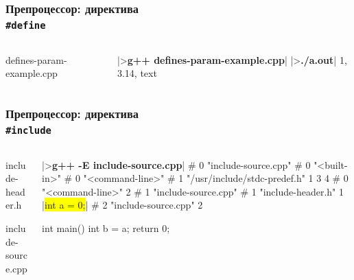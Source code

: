 \documentclass[compress]{beamer}
\newcommand{\shellprompt}{>}
\newcommand{\shellcommand}[1]{\shellprompt \space \textbf{#1}}
\begin{document}
\begin{frame}[fragile]

    \frametitle{Препроцессор: директива \\ \texttt{\#define}}

    \begin{columns}[T]

        \begin{column}{0.5\textwidth}

                {defines-param-example.cpp}

        \end{column}

        \begin{column}{0.5\textwidth}

            \begin{ConsoleWindow}
|\shellcommand{g++ defines-param-example.cpp}|
|\shellcommand{./a.out}|
1, 3.14, text
            \end{ConsoleWindow}

        \end{column}

    \end{columns}

\end{frame}

\begin{frame}[fragile]

    \frametitle{Препроцессор: директива \\ \texttt{\#include}}

    \begin{columns}[T]

        \begin{column}{0.5\textwidth}

                {include-header.h}

                {include-source.cpp}

        \end{column}

        \begin{column}{0.5\textwidth}

            \begin{ConsoleWindow}
|\shellcommand{g++ -E include-source.cpp}|
# 0 "include-source.cpp"
# 0 "<built-in>"
# 0 "<command-line>"
# 1 "/usr/include/stdc-predef.h" 1 3 4
# 0 "<command-line>" 2
# 1 "include-source.cpp"
# 1 "include-header.h" 1
|\colorbox{yellow}{int a = 0;}|
# 2 "include-source.cpp" 2

int main() {
    int b = a;
    return 0;
}
            \end{ConsoleWindow}

        \end{column}

    \end{columns}

\end{frame}
\end{document}

